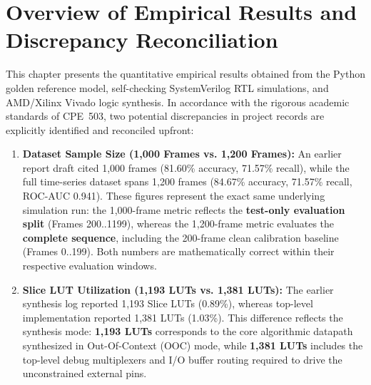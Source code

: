 \documentclass[12pt,a4paper]{report}
\begin{document}
\section{Overview of Empirical Results and Discrepancy Reconciliation}
This chapter presents the quantitative empirical results obtained from the Python golden
reference model, self-checking SystemVerilog RTL simulations, and AMD/Xilinx Vivado logic
synthesis. In accordance with the rigorous academic standards of CPE~503, two potential
discrepancies in project records are explicitly identified and reconciled upfront:
\begin{enumerate}
    \item \textbf{Dataset Sample Size (1,000 Frames vs. 1,200 Frames):} An earlier report
    draft cited 1,000 frames (81.60\% accuracy, 71.57\% recall), while the full time-series
    dataset spans 1,200 frames (84.67\% accuracy, 71.57\% recall, ROC-AUC 0.941). These figures
    represent the exact same underlying simulation run: the 1,000-frame metric reflects the
    \textbf{test-only evaluation split} (Frames 200..1199), whereas the 1,200-frame metric
    evaluates the \textbf{complete sequence}, including the 200-frame clean calibration baseline
    (Frames 0..199). Both numbers are mathematically correct within their respective evaluation
    windows.
    \item \textbf{Slice LUT Utilization (1,193 LUTs vs. 1,381 LUTs):} The earlier synthesis log
    reported 1,193 Slice LUTs (0.89\%), whereas top-level implementation reported 1,381 LUTs
    (1.03\%). This difference reflects the synthesis mode: \textbf{1,193 LUTs} corresponds to
    the core algorithmic datapath synthesized in Out-Of-Context (OOC) mode, while \textbf{1,381 LUTs}
    includes the top-level debug multiplexers and I/O buffer routing required to drive the
    unconstrained external pins.
\end{enumerate}
\end{document}
